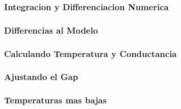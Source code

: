 



\frame
{
  \frametitle{Integracion y Differenciacion Numerica}
}



\frame
{
  \frametitle{Differencias al Modelo}
}



\frame
{
  \frametitle{Calculando Temperatura y Conductancia}
}



\frame
{
  \frametitle{Ajustando el Gap}
}



\frame
{
  \frametitle{Temperaturas mas bajas}
}